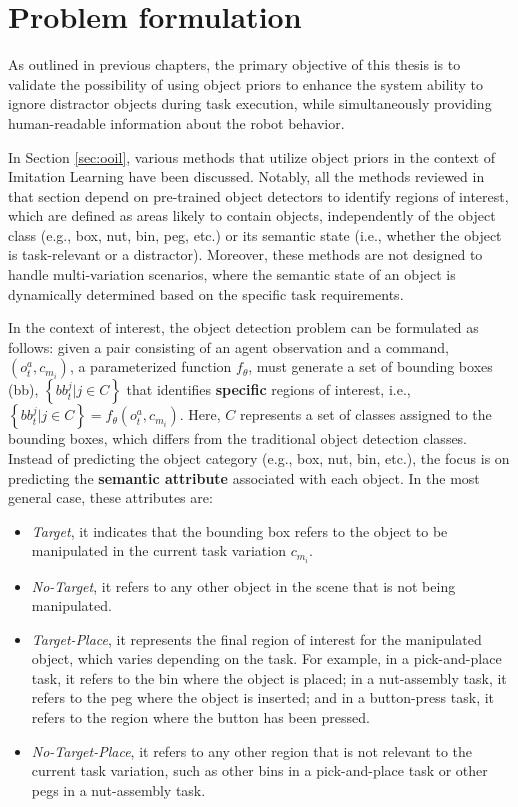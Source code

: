 \section{Problem formulation}
\label{sec:cod_problem}
As outlined in previous chapters, the primary objective of this thesis is to validate the possibility of using object priors to enhance the system ability to ignore distractor objects during task execution, while simultaneously providing human-readable information about the robot behavior.

In Section \ref{sec:ooil}, various methods that utilize object priors in the context of Imitation Learning have been discussed. Notably, all the methods reviewed in that section depend on pre-trained object detectors to identify regions of interest, which are defined as areas likely to contain objects, independently of the object class (e.g., box, nut, bin, peg, etc.) or its semantic state (i.e., whether the object is task-relevant or a distractor). Moreover, these methods are not designed to handle multi-variation scenarios, where the semantic state of an object is dynamically determined based on the specific task requirements.

In the context of interest, the object detection problem can be formulated as follows: given a pair consisting of an agent observation and a command, $\left( o_{t}^{a}, c_{m_{i}} \right)$,  a parameterized function $f_{\theta}$, must generate a set of bounding boxes (bb), $\left\{ bb^{j}_{t} | j \in C \right\}$ that identifies \textbf{specific} regions of interest, i.e., $\left\{ bb^{j}_{t} | j \in C \right\} = f_{\theta}(o_{t}^{a}, c_{m_{i}})$. Here, $C$ represents a set of classes assigned to the bounding boxes, which differs from the traditional object detection classes. Instead of predicting the object category (e.g., box, nut, bin, etc.), the focus is on predicting the \textbf{semantic attribute} associated with each object. In the most general case, these attributes are:

\begin{itemize} 
    \item \textit{Target}, it indicates that the bounding box refers to the object to be manipulated in the current task variation $c_{m_{i}}$. 
    \item \textit{No-Target}, it refers to any other object in the scene that is not being manipulated. 
    \item \textit{Target-Place}, it represents the final region of interest for the manipulated object, which varies depending on the task. For example, in a pick-and-place task, it refers to the bin where the object is placed; in a nut-assembly task, it refers to the peg where the object is inserted; and in a button-press task, it refers to the region where the button has been pressed. 
    \item \textit{No-Target-Place}, it refers to any other region that is not relevant to the current task variation, such as other bins in a pick-and-place task or other pegs in a nut-assembly task. 
\end{itemize}

